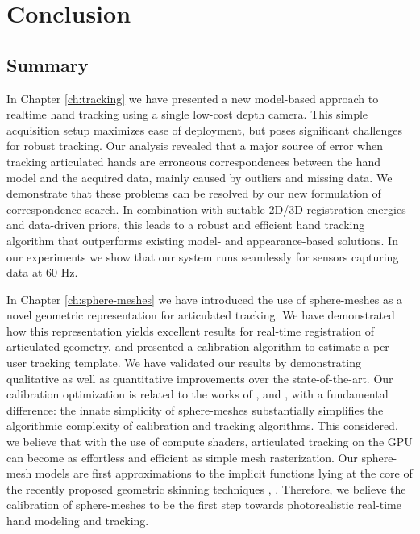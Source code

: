 
\chapter{Conclusion}

\section{Summary}

In Chapter \ref{ch:tracking} we have presented a new model-based approach to realtime hand tracking using a single low-cost depth camera. This simple acquisition setup maximizes ease of deployment, but poses significant challenges for robust tracking. 
Our analysis revealed that a major source of error when tracking articulated hands are erroneous correspondences between the hand model and the acquired data, mainly caused by outliers and missing data. 
We demonstrate that these problems can be resolved by our new formulation of correspondence search. In combination with suitable 2D/3D registration energies and data-driven priors, this leads to a robust and efficient hand tracking algorithm that outperforms existing model- and appearance-based solutions. In our experiments we show that our system runs seamlessly for sensors capturing data at 60 Hz. 

In Chapter \ref{ch:sphere-meshes} we have introduced the use of sphere-meshes as a novel geometric representation for articulated tracking. We have demonstrated how this representation yields excellent results for real-time registration of articulated geometry, and presented a calibration algorithm to estimate a per-user tracking template. We have validated our results by demonstrating qualitative as well as quantitative improvements over the state-of-the-art. Our calibration optimization is related to the works of \cite{taylor2014user},  \cite{khamis15learning} and  \cite{joseph2016fits}, with a fundamental difference: the innate simplicity of sphere-meshes substantially simplifies the algorithmic complexity of calibration and tracking algorithms. This considered, we believe that with the use of compute shaders, articulated tracking on the GPU can become as effortless and efficient as simple mesh rasterization. 
Our sphere-mesh models are first approximations to the implicit functions lying at the core of the recently proposed geometric skinning techniques \cite{vaillant2013implicit},  \cite{vaillant2014robust}. Therefore, we believe the calibration of sphere-meshes to be the first step towards photorealistic real-time hand modeling and tracking.

